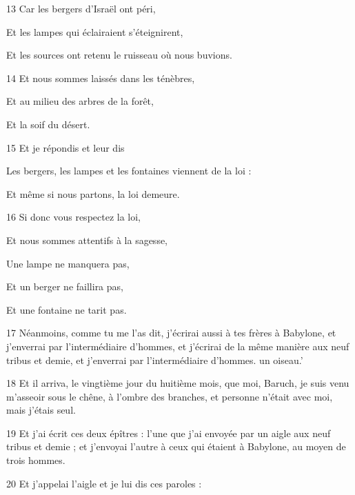 \par 13 Car les bergers d'Israël ont péri,

\par Et les lampes qui éclairaient s'éteignirent,

\par Et les sources ont retenu le ruisseau où nous buvions.

\par 14 Et nous sommes laissés dans les ténèbres,

\par Et au milieu des arbres de la forêt,

\par Et la soif du désert.

\par 15 Et je répondis et leur dis

\par Les bergers, les lampes et les fontaines viennent de la loi :

\par Et même si nous partons, la loi demeure.

\par 16 Si donc vous respectez la loi,

\par Et nous sommes attentifs à la sagesse,

\par Une lampe ne manquera pas,

\par Et un berger ne faillira pas,

\par Et une fontaine ne tarit pas.

\par 17 Néanmoins, comme tu me l'as dit, j'écrirai aussi à tes frères à Babylone, et j'enverrai par l'intermédiaire d'hommes, et j'écrirai de la même manière aux neuf tribus et demie, et j'enverrai par l'intermédiaire d'hommes. un oiseau.'

\par 18 Et il arriva, le vingtième jour du huitième mois, que moi, Baruch, je suis venu m'asseoir sous le chêne, à l'ombre des branches, et personne n'était avec moi, mais j'étais seul.

\par 19 Et j'ai écrit ces deux épîtres : l'une que j'ai envoyée par un aigle aux neuf tribus et demie ; et j'envoyai l'autre à ceux qui étaient à Babylone, au moyen de trois hommes.

\par 20 Et j'appelai l'aigle et je lui dis ces paroles :

